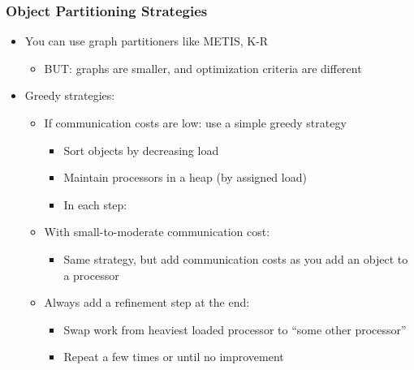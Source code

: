 \begin{frame}[fragile]
\frametitle{Object Partitioning Strategies}
\begin{itemize}
 \item You can use graph partitioners like METIS, K-R
 \begin{itemize}
  \item BUT: graphs are smaller, and optimization criteria are different
 \end{itemize}
 \item Greedy strategies:
 \begin{itemize}
  \item If communication costs are low: use a simple greedy strategy
  \begin{itemize}
   \item Sort objects by decreasing load
   \item Maintain processors in a heap (by assigned load)
   \item In each step: 
  \end{itemize}
  \item With small-to-moderate communication cost:
  \begin{itemize}
   \item Same strategy, but add communication costs as you add an object to a processor
  \end{itemize}
  \item Always add a refinement step at the end:
  \begin{itemize}
   \item Swap work from heaviest loaded processor to ``some other processor''
   \item Repeat a few times or until no improvement 
  \end{itemize}
 \end{itemize}
\end{itemize}
\end{frame}


